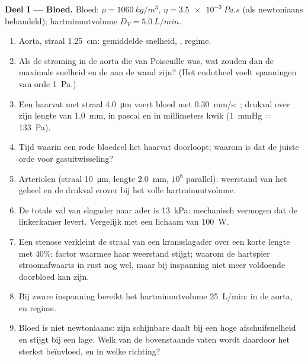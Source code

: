 \begin{problem}
\medskip
\noindent\textbf{Deel I --- Bloed.}
Bloed: $\rho = \qty{1060}{kg/m^3}$, $\eta = \qty{3.5e-3}{Pa.s}$ (als
newtoniaans behandeld); hartminuutvolume $D_V = \qty{5.0}{L/min}$.
\begin{enumerate}
  \item Aorta, straal \qty{1.25}{cm}: gemiddelde snelheid, , regime.
  \item Als de stroming in de aorta die van Poiseuille was, wat zouden dan
        de maximale snelheid en de  aan de wand zijn? (Het
        endotheel voelt spanningen van orde \qty{1}{Pa}.)
  \item Een haarvat met straal \qty{4.0}{\micro m} voert bloed met
        \qty{0.30}{mm/s}: ; drukval over zijn lengte van
        \qty{1.0}{mm}, in pascal en in millimeters kwik (\qty{1}{mmHg} =
        \qty{133}{Pa}).
  \item Tijd waarin een rode bloedcel het haarvat doorloopt; waarom is dat
        de juiste orde voor gasuitwisseling?
  \item Arteriolen (straal \qty{10}{\micro m}, lengte \qty{2.0}{mm}, $10^8$
        parallel): weerstand van het geheel en de drukval erover bij het
        volle hartminuutvolume.
  \item De totale val van slagader naar ader is \qty{13}{kPa}: mechanisch
        vermogen dat de linkerkamer levert. Vergelijk met een lichaam van
        \qty{100}{W}.
  \item Een stenose verkleint de straal van een kransslagader over een korte
        lengte met $40\%$: factor waarmee haar weerstand stijgt; waarom de
        hartspier stroomafwaarts in rust nog wel, maar bij inspanning niet
        meer voldoende doorbloed kan zijn.
  \item Bij zware inspanning bereikt het hartminuutvolume \qty{25}{L/min}:
         in de aorta, en regime.
  \item Bloed is niet newtoniaans: zijn schijnbare  daalt bij een
        hoge afschuifsnelheid en stijgt bij een lage. Welk van de
        bovenstaande vaten wordt daardoor het sterkst beïnvloed, en in welke
        richting?
\end{enumerate}


\end{problem}
